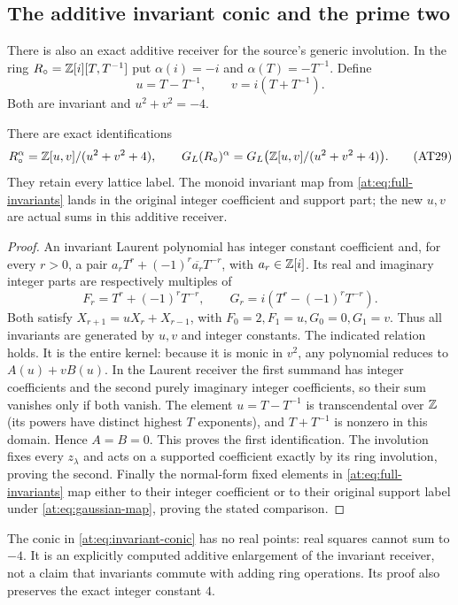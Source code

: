 \subsection{The additive invariant conic and the prime two}

There is also an exact additive receiver for the source's generic
involution. In the ring $R_\circ=\mathbb Z[i][T,T^{-1}]$ put
$\alpha(i)=-i$ and $\alpha(T)=-T^{-1}$. Define
\[
 u=T-T^{-1},\qquad v=i(T+T^{-1}).
 \tag{AT28}\label{at:eq:conic-coordinates}
\]
Both are invariant and $u^2+v^2=-4$.

\begin{theorem}
\label{at:thm:invariant-conic}
There are exact identifications
\[
 R_\circ^\alpha=\mathbb Z[u,v]/(u^2+v^2+4),\qquad
 G_L(R_\circ)^\alpha=G_L\bigl(\mathbb Z[u,v]/(u^2+v^2+4)\bigr).
 \tag{AT29}\label{at:eq:invariant-conic}
\]
They retain every lattice label. The monoid invariant map from
\eqref{at:eq:full-invariants} lands in the original integer
coefficient and support part; the new $u,v$ are actual sums
in this additive receiver.
\end{theorem}
\begin{proof}
An invariant Laurent polynomial has integer constant coefficient
and, for every $r>0$, a pair
$a_rT^r+(-1)^r\overline{a_r}T^{-r}$, with $a_r\in\mathbb Z[i]$.
Its real and imaginary integer parts are respectively multiples of
\[
 F_r=T^r+(-1)^rT^{-r},\qquad
 G_r=i(T^r-(-1)^rT^{-r}).
\]
Both satisfy $X_{r+1}=uX_r+X_{r-1}$, with
$F_0=2,F_1=u,G_0=0,G_1=v$. Thus all invariants are generated
by $u,v$ and integer constants. The indicated relation holds.
It is the entire kernel: because it is monic in $v^2$, any
polynomial reduces to $A(u)+vB(u)$. In the Laurent receiver the
first summand has integer coefficients and the second purely
imaginary integer coefficients, so their sum vanishes only if
both vanish. The element $u=T-T^{-1}$ is transcendental over
$\mathbb Z$ (its powers have distinct highest $T$ exponents), and
$T+T^{-1}$ is nonzero in this domain. Hence $A=B=0$.
This proves the first identification. The involution fixes every
$z_\lambda$ and acts on a supported coefficient exactly by its
ring involution, proving the second. Finally the normal-form
fixed elements in \eqref{at:eq:full-invariants} map either to their
integer coefficient or to their original support label under
\eqref{at:eq:gaussian-map}, proving the stated comparison.
\end{proof}

The conic in \eqref{at:eq:invariant-conic} has no real points:
real squares cannot sum to $-4$. It is an explicitly computed
additive enlargement of the invariant receiver, not a claim
that invariants commute with adding ring operations. Its proof
also preserves the exact integer constant $4$.

